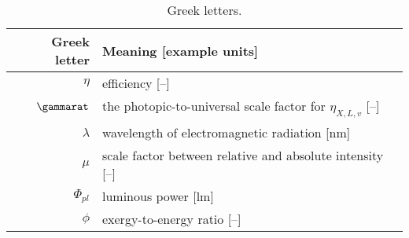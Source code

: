 
\begin{table}
\centering %
\caption{Greek letters.}
\begin{tabular}{r l}
  \toprule
  Greek letter & Meaning [example units] \\
  \midrule
  $\eta$ & efficiency [--] \\
  $\gammarat$ & the photopic-to-universal scale factor for $\eta_{X,L,v}$ [--] \\
  $\lambda$ & wavelength of electromagnetic radiation [nm] \\
  $\mu$ & scale factor between relative and absolute intensity [--] \\
  $\Phi_{pl}$ & luminous power [lm] \\
  $\phi$ & exergy-to-energy ratio [--] \\
  \bottomrule
\end{tabular}
\label{tab:greek}
\end{table}


  
